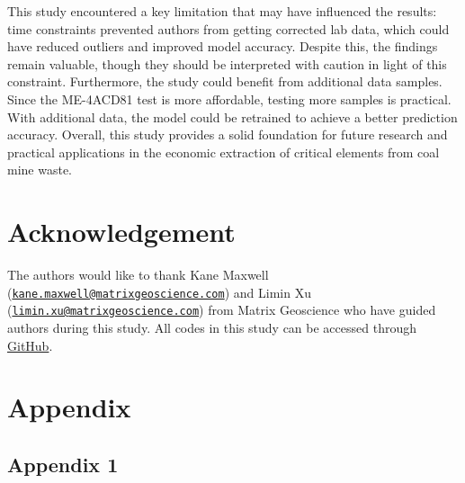 \documentclass[11pt,a4paper,]{article}
\begin{document}
This study encountered a key limitation that may have influenced the results: time constraints prevented authors from getting corrected lab data, which could have reduced outliers and improved model accuracy. Despite this, the findings remain valuable, though they should be interpreted with caution in light of this constraint. Furthermore, the study could benefit from additional data samples. Since the ME-4ACD81 test is more affordable, testing more samples is practical. With additional data, the model could be retrained to achieve a better prediction accuracy. Overall, this study provides a solid foundation for future research and practical applications in the economic extraction of critical elements from coal mine waste.

\section{Acknowledgement}\label{acknowledgement}

The authors would like to thank Kane Maxwell (\href{mailto:kane.maxwell@matrixgeoscience.com}{\nolinkurl{kane.maxwell@matrixgeoscience.com}}) and Limin Xu (\href{mailto:limin.xu@matrixgeoscience.com}{\nolinkurl{limin.xu@matrixgeoscience.com}}) from Matrix Geoscience who have guided authors during this study. All codes in this study can be accessed through \href{https://github.com/evanginting/ETC5543_Project}{GitHub}.

\newpage

\section{Appendix}\label{appendix}

\subsection{Appendix 1}\label{sec-appendixone}

\begingroup\fontsize{9}{11}\selectfont
\end{document}
